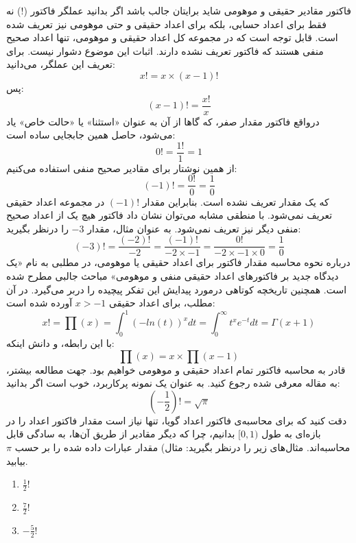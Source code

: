 \begin{EXTRA}{
    فاکتور مقادیر حقیقی و موهومی
}
\p
شاید برایتان جالب باشد اگر بدانید عملگر فاکتور ($!$)
نه فقط برای اعداد حسابی، بلکه برای اعداد حقیقی و حتی موهومی نیز تعریف شده است.
قابل توجه است که در مجموعه کل اعداد حقیقی و موهومی، تنها اعداد صحیح منفی هستند
که فاکتور تعریف نشده دارند. اثبات این موضوع دشوار نیست.
برای تعریف این عملگر، می‌دانید:
$$x! = x \times (x-1)!$$
پس:
$$(x-1)! = \frac{x!}{x}$$
درواقع فاکتور مقدار صفر، که گاها از آن به عنوان «استثنا» یا «حالت خاص» یاد می‌شود،
حاصل همین جابجایی ساده است:
$$0! = \frac{1!}{1} = 1$$
\p
از همین نوشتار برای مقادیر صحیح منفی استفاده می‌کنیم:
$$(-1)! = \frac{0!}{0} = \frac{1}{0}$$
که یک مقدار تعریف نشده است. بنابراین مقدار $(-1)!$ در مجموعه اعداد حقیقی تعریف نمی‌شود.
با منطقی مشابه می‌توان نشان داد فاکتور هیچ یک از اعداد صحیح منفی دیگر نیز تعریف نمی‌شود.
به عنوان مثال، مقدار $-3$ را درنظر بگیرید:
$$(-3)! = \frac{(-2)!}{-2} = \frac{(-1)!}{-2\times-1} = \frac{0!}{-2\times-1\times 0} = \frac{1}{0}$$
\p
درباره نحوه محاسبه مقدار فاکتور برای اعداد حقیقی یا موهومی، در مطلبی به نام 
«یک دیدگاه جدید بر فاکتور‌های اعداد حقیقی منفی و موهومی»
مباحث جالبی مطرح شده است. همچنین تاریخچه کوتاهی درمورد پیدایش این تفکر پیچیده را دربر می‌گیرد.
\p
در آن مطلب، برای اعداد حقیقی $x>-1$ آورده شده است:
$$x! = \prod(x) = \int_0^1 (-ln(t))^x dt = \int_0^\infty t^x e^{-t} dt = \Gamma(x+1)$$
با این رابطه، و دانش اینکه:
$$\prod(x) = x\times \prod(x-1)$$
قادر به محاسبه فاکتور تمام اعداد حقیقی و موهومی خواهیم بود.
جهت مطالعه بیشتر، به مقاله معرفی شده رجوع کنید.
\p
به عنوان یک نمونه پرکاربرد، خوب است اگر بدانید:
$$(-\frac{1}{2})! = \sqrt{\pi}$$
دقت کنید که برای محاسبه‌ی 
فاکتور اعداد گویا، تنها نیاز است مقدار فاکتور اعداد را در بازه‌ای به طول $[0,1)$ بدانیم، چرا که دیگر مقادیر از طریق آن‌ها، به سادگی قابل محاسبه‌اند.
مثال‌های زیر را درنظر بگیرید:
\p
مثال) مقدار عبارات داده شده را بر حسب
$\pi$
بیابید.
\begin{enumerate}
    \item 
    $\frac{1}{2}!$

    \item 
    $\frac{7}{2}!$
    
    \item 
    $-\frac{5}{2}!$
    
\end{enumerate}

\end{EXTRA}